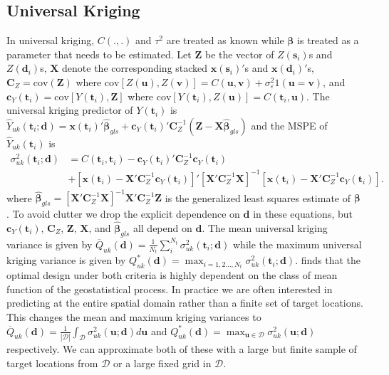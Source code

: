 \documentclass[cmbright]{staauth}
\newcommand{\cov}{\mathrm{cov}}
\begin{document}
\subsection{Universal Kriging}
In universal kriging, $C(.,.)$ and $\tau^2$ are treated as known while $\bm{\beta}$ is treated as a parameter that needs to be estimated. Let $\bm{Z}$ be the vector of $Z(\bm{s}_i)$s and $Z(\bm{d}_i)$s, $\bm{X}$ denote the corresponding stacked $\bm{x}(\bm{s}_i)'$s and $\bm{x}(\bm{d}_i)'$s, $\bm{C}_Z = \cov(\bm{Z})$ where $\cov[Z(\bm{u}), Z(\bm{v})] = C(\bm{u},\bm{v}) + \sigma^2_\varepsilon 1(\bm{u} = \bm{v})$, and $\bm{c}_Y(\bm{t}_i) = \cov[Y(\bm{t}_i), \bm{Z}]$ where $\cov[Y(\bm{t}_i), Z(\bm{u})] = C(\bm{t}_i, \bm{u})$. The universal kriging predictor of $Y(\bm{t}_i)$ is $\widehat{Y}_{uk}(\bm{t}_i;\bm{d}) = \bm{x}(\bm{t}_i)'\widehat{\bm{\beta}}_{gls} + \bm{c}_Y(\bm{t}_i)'\bm{C}_Z^{-1}(\bm{Z} - \bm{X}\widehat{\bm{\beta}}_{gls})$ and the MSPE of $\widehat{Y}_{uk}(\bm{t}_i)$ is
\begin{align*}
\sigma_{uk}^2(\bm{t}_i;\bm{d}) &= C(\bm{t}_i, \bm{t}_i) - \bm{c}_Y(\bm{t}_i)'\bm{C}_Z^{-1}\bm{c}_Y(\bm{t}_i)  \\
& + [\bm{x}(\bm{t}_i)  - \bm{X}'\bm{C}_Z^{-1}\bm{c}_Y(\bm{t}_i)]'[\bm{X}'\bm{C}_Z^{-1}\bm{X}]^{-1}[\bm{x}(\bm{t}_i)  - \bm{X}'\bm{C}_Z^{-1}\bm{c}_Y(\bm{t}_i)].
\end{align*}
where $\widehat{\bm{\beta}}_{gls} = [\bm{X}'\bm{C}_Z^{-1}\bm{X}]^{-1}\bm{X}'\bm{C}_Z^{-1}\bm{Z}$ is the generalized least squares estimate of $\bm{\beta}$ \citep[Section~4.1.2]{cressie2011statistics}. To avoid clutter we drop the explicit dependence on $\bm{d}$ in these equations, but $\bm{c}_Y(\bm{t}_i)$, $\bm{C}_Z$, $\bm{Z}$, $\bm{X}$, and $\widehat{\bm{\beta}}_{gls}$ all depend on $\bm{d}$. The mean universal kriging variance is given by $\overline{Q}_{uk}(\bm{d}) = \frac{1}{N_t}\sum_{i}^{N_t}\sigma^2_{uk}(\bm{t}_i;\bm{d})$ while the maximum universal kriging variance is given by $Q_{uk}^*(\bm{d}) = \max_{i=1,2\dots,N_t}\sigma^2_{uk}(\bm{t}_i;\bm{d})$. \cite{zimmerman2006optimal} finds that the optimal design under both criteria is highly dependent on the class of mean function of the geostatistical process. In practice we are often interested in predicting at the entire spatial domain rather than a finite set of target locations. This changes the mean and maximum kriging variances to $\overline{Q}_{uk}(\bm{d}) = \frac{1}{|\mathcal{D}|}\int_{\mathcal{D}}\sigma^2_{uk}(\bm{u};\bm{d})d\bm{u}$ and $Q_{uk}^*(\bm{d}) = \max_{\bm{u}\in\mathcal{D}}\sigma^2_{uk}(\bm{u};\bm{d})$ respectively. We can approximate both of these with a large but finite sample of target locations from $\mathcal{D}$ or a large fixed grid in $\mathcal{D}$.
\end{document}
